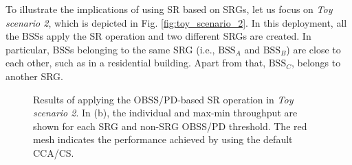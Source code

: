 \documentclass{ieeeaccess}
\begin{document}
To illustrate the implications of using SR based on SRGs, let us focus on \emph{Toy scenario 2}, which is depicted in Fig. \ref{fig:toy_scenario_2}. In this deployment, all the BSSs apply the SR operation and two different SRGs are created. In particular, BSSs belonging to the same SRG (i.e., $\text{BSS}_A$ and $\text{BSS}_B$) are close to each other, such as in a residential building. Apart from that, $\text{BSS}_C$, belongs to another SRG. 

\begin{figure}[ht!]
	\centering
	\hspace{1cm}
	\caption{Results of applying the OBSS/PD-based SR operation in \emph{Toy scenario 2}. In (b), the individual and max-min throughput are shown for each SRG and non-SRG OBSS/PD threshold. The red mesh indicates the performance achieved by using the default CCA/CS.}
	\label{fig:fig:17}
\end{figure}
\end{document}
